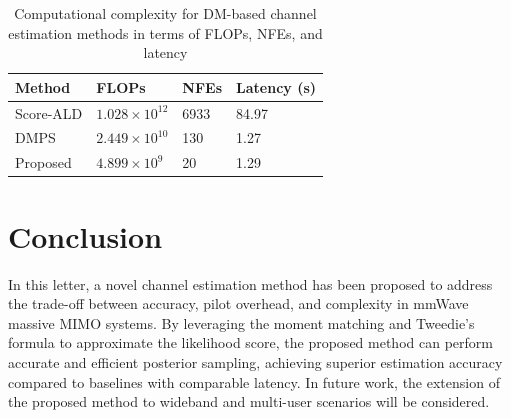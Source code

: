 \documentclass[lettersize,journal]{IEEEtran}
\begin{document}
\begin{table}[!t]
\centering
\renewcommand{\arraystretch}{1.1} 
\caption{Computational complexity for DM-based channel estimation methods in terms of FLOPs, NFEs, and latency}
\label{tab:table1}
\begin{tabular}{M{0.20\columnwidth}|M{0.21\columnwidth}|M{0.20\columnwidth}|M{0.20\columnwidth}}
\hline
\textbf{Method} & \textbf{FLOPs} & \textbf{NFEs} & \textbf{Latency (s)} \\
\hline
Score-ALD\cite{arvinteMIMOChannelEstimation2023} & \(1.028 \times 10^{12}\) & 6933 & 84.97 \\
\hline
DMPS\cite{zhouGenerativeDiffusionModels2025} & \(2.449 \times 10^{10}\) & 130 & 1.27 \\
\hline
Proposed & \(4.899 \times 10^9\) & 20 & 1.29 \\
\hline
\end{tabular}
\end{table}

\section{Conclusion}

In this letter, a novel channel estimation method has been proposed to address the trade-off between accuracy, pilot overhead, and complexity in mmWave massive MIMO systems. By leveraging the moment matching and Tweedie's formula to approximate the likelihood score, the proposed method can perform accurate and efficient posterior sampling, achieving superior estimation accuracy compared to baselines with comparable latency. In future work, the extension of the proposed method to wideband and multi-user scenarios will be considered.


% 

\end{document}
